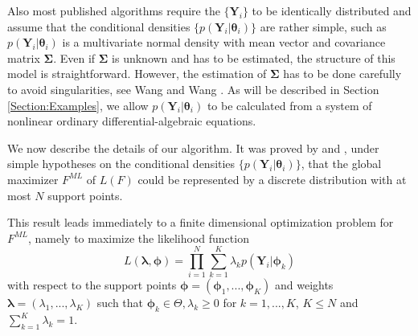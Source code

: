 Also most published algorithms require the $\{\bm{Y}_i\}$ to be identically distributed and assume that the conditional densities $\{p(\bm{Y}_i \vert \bm{\theta}_i)\}$ 
are rather simple, such as $p(\bm{Y}_i \vert \bm{\theta}_i)$ is a multivariate normal density with mean vector and covariance matrix $\bm{\Sigma}$.
%
%
Even if $\bm{\Sigma}$ is unknown and has to be estimated, the structure of this model is straightforward. However, the estimation of $\bm{\Sigma}$ has to be done carefully to avoid singularities, see Wang and Wang \cite{Wang2015}.
As will be described in Section \ref{Section:Examples}, we allow  $p(\bm{Y}_i \vert \bm{\theta}_i)$ to be calculated from a  system of nonlinear ordinary differential-algebraic  equations.

We now describe the details of our algorithm. It was proved by
\citet {Lindsay1983} and \citet {Mallet1986} , 
under simple hypotheses
on the conditional densities $\{p(\bm{Y}_i \vert \bm{\theta}_i)\}$, that  the global maximizer $F^{ML}$ of $L(F)$ could be represented by a discrete distribution with at most $N$ support points.


%
This result leads immediately to a finite dimensional optimization problem for $F^{ML}$, namely to maximize the likelihood function
\begin{equation}
	L( \bm{\lambda}, \bm{\phi}) =\prod_{i=1}^N \sum_{k=1}^K  \lambda_k p\left( \bm{Y}_i \vert  \bm{\phi}_k \right)
\label{Eqn:Likelihood001}
\end{equation}
with respect to the support points $\bm{\phi} = ( \bm{\phi}_1, ... ,  \bm{\phi}_K)$ 
and weights $ \bm{\lambda} = ( \lambda_1, ... ,\lambda_K)$  such that 
$  \bm{\phi}_k \in \Theta, \lambda_k \geq 0$
for $k=1, ... , K$, $K \leq N$ and \; $\sum_{k=1}^K   \lambda_k = 1$. 



